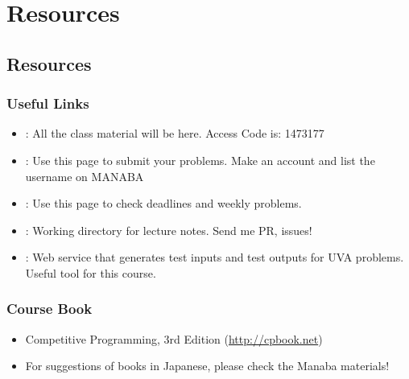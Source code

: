 \documentclass{beamer}
\begin{document}
\section{Resources}
\subsection{Resources}

\begin{frame}
  \frametitle{Useful Links}
  \begin{itemize} 
  \item
    \href{https://manaba.tsukuba.ac.jp/ct/course_971789}
         {}: All the class material
         will be here. Access Code is: 1473177

    \medskip

  \item \href{https://uva.onlinejudge.org/}{}:
    Use this page to submit your problems. \alert{Make an account and list the username on MANABA}

    \medskip

  \item \href{https://conclave.cs.tsukuba.ac.jp/lecture/monitor.html}{}:
    Use this page to check deadlines and weekly problems.

    \medskip

  \item
    \href{https://www.github.com/caranha/ProgrammingChallengesLectureNotes}{}:
    Working directory for lecture notes. Send me PR, issues!

    \medskip
    
  \item
    \href{https://www.udebug.com/}{}:
    Web service that generates test inputs and test outputs for UVA
    problems. Useful tool for this course.
  \end{itemize}
\end{frame}


\begin{frame}
  \frametitle{Course Book}

  \begin{itemize}
  \item Competitive Programming, 3rd Edition
    (\href{http://cpbook.net/}{http://cpbook.net})
    
    \bigskip

  \item For suggestions of books in Japanese, please check the Manaba materials!
  \end{itemize}
\end{frame}
\end{document}
